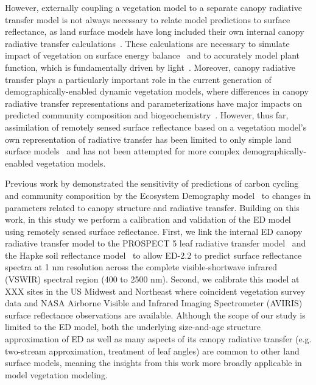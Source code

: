 However, externally coupling a vegetation model to a separate canopy radiative transfer model is not always necessary to relate model predictions to surface reflectance,
as land surface models have long included their own internal canopy radiative transfer calculations~\parencite{dickinson1983land, sellers1985canopy}.
These calculations are necessary to simulate impact of vegetation on surface energy balance~\parencite{bonan2008forests} and to accurately model plant function, which is fundamentally driven by light~\parencite{hikosaka1995model, robakowski_2004_growth, niinemets2016withincanopy, keenan2016global}.
Moreover, canopy radiative transfer plays a particularly important role in the current generation of demographically-enabled dynamic vegetation models, where differences in canopy radiative transfer representations and parameterizations have major impacts on predicted community composition and biogeochemistry~\parencite{loew_2014_do, fisher2017vegetation, viskari_2019_influence}.
However, thus far, assimilation of remotely sensed surface reflectance based on a vegetation model's own representation of radiative transfer has been limited to only simple land surface models~\parencite[e.g. SiPNET][]{zobitz_2014_joint} and has not been attempted for more complex demographically-enabled vegetation models.

Previous work by \textcite{viskari_2019_influence} demonstrated the sensitivity of predictions of carbon cycling and community composition by the Ecosystem Demography model~\parencite{medvigy2009mechanistic} to changes in parameters related to canopy structure and radiative transfer.
Building on this work, in this study we perform a calibration and validation of the ED model using remotely sensed surface reflectance.
First, we link the internal ED canopy radiative transfer model to the PROSPECT 5 leaf radiative transfer model~\parencite{feret2008prospect4} and the Hapke soil reflectance model~\parencite{verhoef2007coupled} to allow ED-2.2 to predict surface reflectance spectra at 1 nm resolution across the complete visible-shortwave infrared (VSWIR) spectral region (400 to 2500 nm).
Second, we calibrate this model at XXX sites in the US Midwest and Northeast where coincident vegetation survey data and NASA Airborne Visible and Infrared Imaging Spectrometer (AVIRIS) surface reflectance observations are available.
Although the scope of our study is limited to the ED model, both the underlying size-and-age structure approximation of ED as well as many aspects of its canopy radiative transfer (e.g. two-stream approximation, treatment of leaf angles) are common to other land surface models, meaning the insights from this work more broadly applicable in model vegetation modeling.
